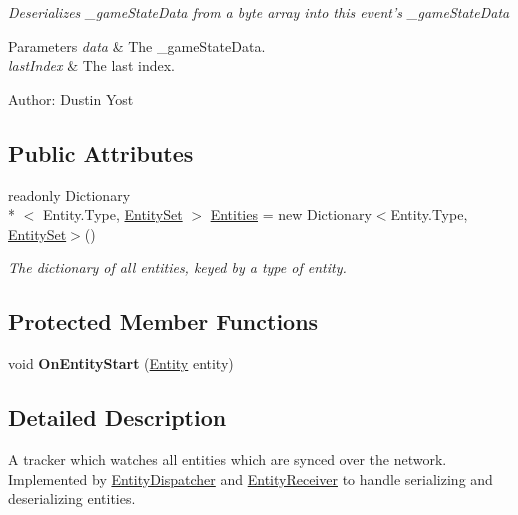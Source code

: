 \begin{DoxyCompactItemize}
\begin{DoxyCompactList}\small\item\em Deserializes \-\_\-game\-State\-Data from a byte array into this event's \-\_\-game\-State\-Data 


\begin{DoxyParams}{Parameters}
{\em data} & The \-\_\-game\-State\-Data.\\
\hline
{\em last\-Index} & The last index.\\
\hline
\end{DoxyParams}


Author\-: Dustin Yost  \end{DoxyCompactList}\end{DoxyCompactItemize}
\subsection*{Public Attributes}
\begin{DoxyCompactItemize}
\item 
readonly Dictionary\\*
$<$ Entity.\-Type, \hyperlink{class_skyrates_1_1_common_1_1_entity_1_1_entity_set}{Entity\-Set} $>$ \hyperlink{class_skyrates_1_1_common_1_1_entity_1_1_entity_tracker_a49ba7b0d14273f75cc16639d929e41b6}{Entities} = new Dictionary$<$Entity.\-Type, \hyperlink{class_skyrates_1_1_common_1_1_entity_1_1_entity_set}{Entity\-Set}$>$()
\begin{DoxyCompactList}\small\item\em The dictionary of all entities, keyed by a type of entity. \end{DoxyCompactList}\end{DoxyCompactItemize}
\subsection*{Protected Member Functions}
\begin{DoxyCompactItemize}
\item 
\hypertarget{class_skyrates_1_1_common_1_1_entity_1_1_entity_tracker_a9c2bf15deaee60718a299d6808580f00}{void {\bfseries On\-Entity\-Start} (\hyperlink{class_skyrates_1_1_common_1_1_entity_1_1_entity}{Entity} entity)}\label{class_skyrates_1_1_common_1_1_entity_1_1_entity_tracker_a9c2bf15deaee60718a299d6808580f00}

\end{DoxyCompactItemize}


\subsection{Detailed Description}
A tracker which watches all entities which are synced over the network. Implemented by \hyperlink{class_skyrates_1_1_common_1_1_entity_1_1_entity_dispatcher}{Entity\-Dispatcher} and \hyperlink{class_skyrates_1_1_common_1_1_entity_1_1_entity_receiver}{Entity\-Receiver} to handle serializing and deserializing entities. 




